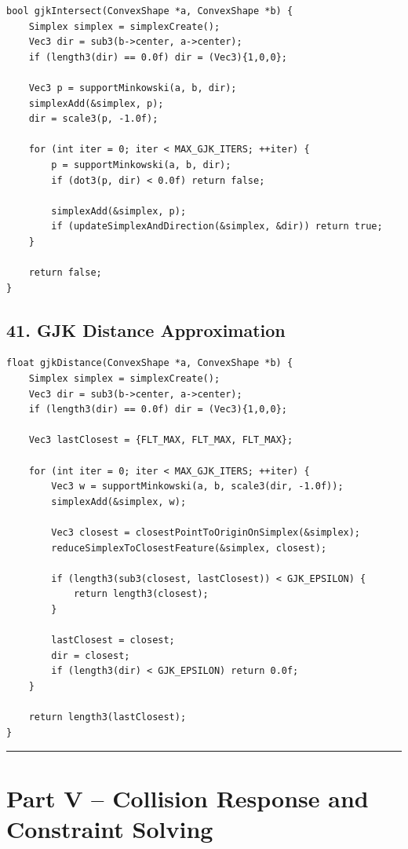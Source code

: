 \documentclass[10pt,letterpaper]{article}
\begin{document}
\begin{verbatim}
bool gjkIntersect(ConvexShape *a, ConvexShape *b) {
    Simplex simplex = simplexCreate();
    Vec3 dir = sub3(b->center, a->center);
    if (length3(dir) == 0.0f) dir = (Vec3){1,0,0};

    Vec3 p = supportMinkowski(a, b, dir);
    simplexAdd(&simplex, p);
    dir = scale3(p, -1.0f);

    for (int iter = 0; iter < MAX_GJK_ITERS; ++iter) {
        p = supportMinkowski(a, b, dir);
        if (dot3(p, dir) < 0.0f) return false;

        simplexAdd(&simplex, p);
        if (updateSimplexAndDirection(&simplex, &dir)) return true;
    }

    return false;
}
\end{verbatim}

\subsection*{41. GJK Distance Approximation}

\begin{verbatim}
float gjkDistance(ConvexShape *a, ConvexShape *b) {
    Simplex simplex = simplexCreate();
    Vec3 dir = sub3(b->center, a->center);
    if (length3(dir) == 0.0f) dir = (Vec3){1,0,0};

    Vec3 lastClosest = {FLT_MAX, FLT_MAX, FLT_MAX};

    for (int iter = 0; iter < MAX_GJK_ITERS; ++iter) {
        Vec3 w = supportMinkowski(a, b, scale3(dir, -1.0f));
        simplexAdd(&simplex, w);

        Vec3 closest = closestPointToOriginOnSimplex(&simplex);
        reduceSimplexToClosestFeature(&simplex, closest);

        if (length3(sub3(closest, lastClosest)) < GJK_EPSILON) {
            return length3(closest);
        }

        lastClosest = closest;
        dir = closest;
        if (length3(dir) < GJK_EPSILON) return 0.0f;
    }

    return length3(lastClosest);
}
\end{verbatim}

\medskip\hrule\medskip

\clearpage
\section*{Part V -- Collision Response and Constraint Solving}
\end{document}
